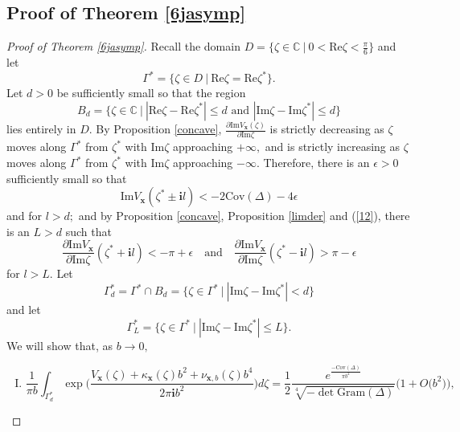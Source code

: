 \documentclass[11pt]{article}
\theoremstyle{remark}
\theoremstyle{remark}
\numberwithin{equation}{section}
\begin{document}
\subsection{Proof of Theorem \ref{6jasymp}} \label{3.3}



\begin{proof}[Proof of Theorem \ref{6jasymp}]
Recall the domain $D=\Big\{ \zeta\in\mathbb C\ \Big|\ 0< \mathrm{Re}\zeta < \frac{\pi}{6} \Big\}$ and let
$$\Gamma^*=\{\zeta\in D\ |\ \mathrm{Re}\zeta=\mathrm{Re}\zeta^*\}.$$ 
Let  $d>0$ be sufficiently small so that the region 
 $$B_{d}=\Big\{\zeta\in \mathbb C \ \Big|\ |\mathrm{Re}\zeta - \mathrm{Re}\zeta^*| \leqslant d \text{ and } |\mathrm{Im}\zeta-\mathrm{Im}\zeta^*|\leqslant d \Big\}$$
 lies entirely in $D.$ By Proposition \ref{concave}, $\frac{\partial \mathrm{Im}V_{\boldsymbol x}(\zeta)}{\partial \mathrm{Im}\zeta}$ is strictly decreasing as $\zeta$ moves along $\Gamma^*$ from $\zeta^*$ with $\mathrm{Im}\zeta$ approaching $+\infty,$ and is strictly increasing as $\zeta$ moves along $\Gamma^*$ from $\zeta^*$ with $\mathrm{Im}\zeta$ approaching $-\infty.$ 
Therefore, there is an $\epsilon>0$ sufficiently small so that 
 \begin{equation}\label{ImU}
\mathrm{Im} V_{\boldsymbol x}(\zeta^*\pm \mathbf il )< -2\mathrm{Cov}(\Delta)-4\epsilon
\end{equation}
and for $l>d;$ and by Proposition \ref{concave},  Proposition \ref{limder} and (\ref{12}),  there is an $L>d$ such that 
\begin{equation}\label{Dv1}
 \frac{\partial \mathrm{Im} V_{\boldsymbol x}}{\partial\mathrm{Im}\zeta } (\zeta^*+  \mathbf i l)<-\pi + \epsilon\quad\text{and}\quad  \frac{\partial \mathrm{Im} V_{\boldsymbol x}}{\partial\mathrm{Im}\zeta} (\zeta^* -  \mathbf i l)>\pi-\epsilon
\end{equation}
for $l>L.$  
Let
$$\Gamma^*_d=\Gamma^*\cap B_d=\Big\{ \zeta \in \Gamma^*\ \Big|\ |\mathrm{Im}\zeta-\mathrm{Im}\zeta^*|<d\Big\}$$
and let 
$$\Gamma^*_L=\Big\{ \zeta \in \Gamma^*\ \Big|\ |\mathrm{Im}\zeta-\mathrm{Im}\zeta^*|\leqslant L\Big\}.$$
We will show that, as $b\to 0,$
\begin{enumerate}[(I)]
\item 
$$\frac{1}{\pi b}\int_{\Gamma^*_d}\exp\bigg(\frac{V_{\boldsymbol  x}(\zeta)+ \kappa_{\boldsymbol  x}(\zeta)b^2+ \nu_{\boldsymbol  x,b}(\zeta)b^4}{2\pi \mathbf i b^2} \bigg)d\zeta = \frac{1}{2} \frac{e^{\frac{-\mathrm{Cov}(\Delta)}{\pi b^2}}}{\sqrt[4]{-\det\mathrm{Gram}(\Delta)}}\Big(1+O\big(b^2\big)\Big),
$$


\end{enumerate}
\end{proof}
\end{document}
